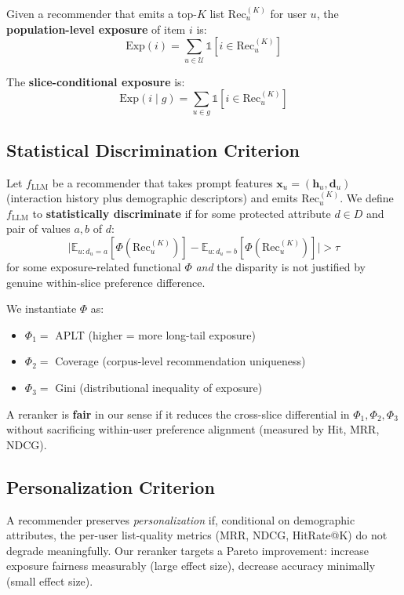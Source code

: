 Given a recommender that emits a top-$K$ list $\text{Rec}_u^{(K)}$ for user $u$, the \textbf{population-level exposure} of item $i$ is:
\begin{equation}
\text{Exp}(i) = \sum_{u \in \mathcal{U}} \mathbb{1}[i \in \text{Rec}_u^{(K)}]
\end{equation}

The \textbf{slice-conditional exposure} is:
\begin{equation}
\text{Exp}(i \mid g) = \sum_{u \in g} \mathbb{1}[i \in \text{Rec}_u^{(K)}]
\end{equation}

\subsection{Statistical Discrimination Criterion}
\label{subsec:stat-disc}

Let $f_{\text{LLM}}$ be a recommender that takes prompt features $\mathbf{x}_u = (\mathbf{h}_u, \mathbf{d}_u)$ (interaction history plus demographic descriptors) and emits $\text{Rec}_u^{(K)}$. We define $f_{\text{LLM}}$ to \textbf{statistically discriminate} if for some protected attribute $d \in D$ and pair of values $a, b$ of $d$:
\begin{equation}
\Big| \mathbb{E}_{u : d_u = a} [\Phi(\text{Rec}_u^{(K)})] - \mathbb{E}_{u : d_u = b} [\Phi(\text{Rec}_u^{(K)})] \Big| > \tau
\label{eq:stat-disc}
\end{equation}
for some exposure-related functional $\Phi$ \emph{and} the disparity is not justified by genuine within-slice preference difference.

We instantiate $\Phi$ as:
\begin{itemize}
\item $\Phi_1 = $ APLT (higher = more long-tail exposure)
\item $\Phi_2 = $ Coverage (corpus-level recommendation uniqueness)
\item $\Phi_3 = $ Gini (distributional inequality of exposure)
\end{itemize}

A reranker is \textbf{fair} in our sense if it reduces the cross-slice differential in $\Phi_1, \Phi_2, \Phi_3$ without sacrificing within-user preference alignment (measured by Hit, MRR, NDCG).

\subsection{Personalization Criterion}

A recommender preserves \emph{personalization} if, conditional on demographic attributes, the per-user list-quality metrics (MRR, NDCG, HitRate@K) do not degrade meaningfully. Our reranker targets a Pareto improvement: increase exposure fairness measurably (large effect size), decrease accuracy minimally (small effect size).
